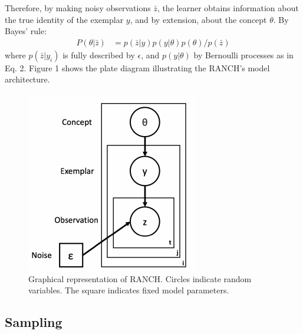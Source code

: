 \documentclass[10pt, letterpaper]{article}
\newenvironment{CodeChunk}{}{}
\begin{document}
Therefore, by making noisy observations \(\bar{z}\), the learner obtains
information about the true identity of the exemplar \(y\), and by
extension, about the concept \(\theta\). By Bayes' rule:
\begin{eqnarray}
P(\theta|\bar{z}) &= p(\bar{z}|y) p(y|\theta) p(\theta) / p(\bar{z})
\end{eqnarray} where \(p(\bar{z}|y_i)\) is fully described by
\(\epsilon\), and \(p(y|\theta)\) by Bernoulli processes as in Eq. 2.
Figure 1 shows the plate diagram illustrating the RANCH's model
architecture.

\begin{CodeChunk}
\begin{figure}[H]

{\centering \includegraphics{figs/plate_diagram-1} 

}

\caption[Graphical representation of RANCH]{Graphical representation of RANCH. Circles indicate random variables. The square indicates fixed model parameters.}\label{fig:plate_diagram}
\end{figure}
\end{CodeChunk}

\hypertarget{sampling}{%
\subsection{Sampling}\label{sampling}}
\end{document}

